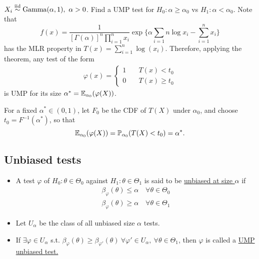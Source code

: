 \begin{exap}
	$X_i \SimIID \mathrm{Gamma}(\alpha, 1),\ \alpha>0$. Find a UMP test for $H_0: \alpha\geq \alpha_0$ vs $H_1: \alpha< \alpha_0$. Note that 
	$$f(x) = \frac{1}{ [\Gamma(\alpha)]^n \prod_{i=1}^n x_i }\exp \big \{   \alpha \sum_{i=1}{n}\log x_i - \sum_{i=1}^n x_i \big \}$$
	has the MLR property in $T(x) = \sum_{i=1}^n \log(x_i)$. Therefore, applying the theorem, any test of the form 
	\begin{align*}
	\varphi(x) = \begin{cases}
	1 &\quad T(x) < t_0 \\
	0 &\quad T(x) \geq t_0
	\end{cases}
	\end{align*}
	is UMP for its size $\alpha^\ast = \mathbb{E}_{\alpha_0}( \varphi(X) )$.
	
	For a fixed $\alpha^\ast \in (0,1)$, let $F_0$ be the CDF of $T(X)$ under $\alpha_0$, and choose $t_0 = F^{-1}(\alpha^\ast)$, so that 
	$$\mathbb{E}_{\alpha_0}( \varphi(X) ) = \mathbb{P}_{\alpha_0} (T(X) < t_0) = \alpha^\ast.$$ 
\end{exap}
 
\subsection{Unbiased tests}
\begin{mydef}\textbf{ }
	\begin{itemize}
		\item A test $\varphi$ of $H_0: \theta \in \Theta_0$ against $H_1: \theta \in \Theta_1$ is said to be \uline{unbiased at size $\alpha$} if 
		\begin{align*}
		\beta_\varphi (\theta) \leq \alpha \quad \forall \theta \in \Theta_0\\
		\beta_\varphi (\theta) \geq \alpha \quad \forall \theta \in \Theta_1
		\end{align*}
		
		\item Let $U_\alpha$ be the class of all unbiased size $\alpha$ tests.
		
		\item If $\exists \varphi \in U_\alpha$ s.t. $\beta_\varphi (\theta) \geq \beta_{\varphi'}(\theta) \ \forall \varphi' \in U_\alpha,\ \forall \theta \in \Theta_1$, then $\varphi$ is called a \uline{UMP unbiased test.}
	\end{itemize}
\end{mydef} 
 
